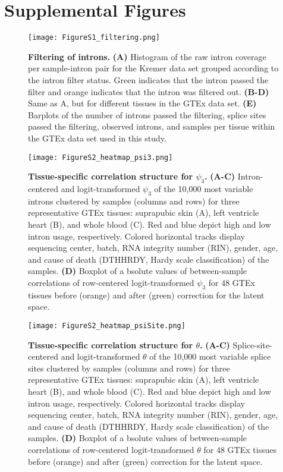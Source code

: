 \documentclass[a4paper,12pt]{article}
\begin{document}
\section{Supplemental Figures}

\begin{figure}[h]
    \centering
    \texttt{[image: FigureS1\_filtering.png]}
    \caption{
        \textbf{Filtering of introns.}
        \textbf{(A)} Histogram of the raw intron coverage per sample-intron pair
for the Kremer data set grouped according to the intron filter status. Green
indicates that the intron passed the filter and orange indicates that the
intron was filtered out. \textbf{(B-D)} Same as A, but for different tissues
in the GTEx data set. \textbf{(E)} Barplots of the number of introns passed
the filtering, splice sites passed the filtering, observed introns, and
samples per tissue within the GTEx data set used in this study.}
\end{figure}
\pagebreak

\begin{figure}[h]
	\centering
 	\texttt{[image: FigureS2\_heatmap\_psi3.png]}
 	\caption{
 	    \textbf{Tissue-specific correlation structure for $\psi_3$.}
 	    \textbf{(A-C)} Intron-centered and logit-transformed $\psi_3$ of the 
10,000 most variable introns clustered by samples (columns and rows)
for three representative GTEx tissues: suprapubic skin (A), 
left ventricle heart (B), and whole blood (C). Red and blue depict high and 
low intron usage, respectively. Colored horizontal tracks display sequencing
center, batch, RNA integrity number (RIN), gender, age, and cause of death 
(DTHHRDY, Hardy scale classification) of the samples. \textbf{(D)} Boxplot of a
bsolute values of between-sample correlations of row-centered logit-transformed
$\psi_3$ for 48 GTEx tissues before (orange) and after (green) correction 
for the latent space.
}
\end{figure}
\pagebreak

\begin{figure}[h]
	\centering
	\texttt{[image: FigureS2\_heatmap\_psiSite.png]}
	\caption{
	    \textbf{Tissue-specific correlation structure for $\theta$.}
	    \textbf{(A-C)} Splice-site-centered and logit-transformed $\theta$
of the 10,000 most variable splice sites clustered by samples (columns and rows)
for three representative GTEx tissues: suprapubic skin (A), 
left ventricle heart (B), and whole blood (C). Red and blue depict high and 
low intron usage, respectively. Colored horizontal tracks display sequencing
center, batch, RNA integrity number (RIN), gender, age, and cause of death 
(DTHHRDY, Hardy scale classification) of the samples. \textbf{(D)} Boxplot of a
bsolute values of between-sample correlations of row-centered logit-transformed
$\theta$ for 48 GTEx tissues before (orange) and after (green) correction 
for the latent space.
}
\end{figure}
\pagebreak
\end{document}
